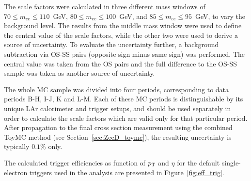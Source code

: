 The scale factors were calculated in three different mass windows of $70 \le m_{ee} \le 110$~GeV, $80 \le m_{ee} \le 100$~GeV, and $85 \le m_{ee} \le 95$~GeV, to vary the background level. The results from the middle mass window were used to define the central value of the scale factors, while the other two were used to derive a source of uncertainty. To evaluate the uncertainty further, a background subtraction via OS-SS pairs (opposite sign minus same sign) was performed. The central value was taken from the OS pairs and the full difference to the OS-SS sample was taken as another source of uncertainty.

The whole MC sample was divided into four periods, corresponding to data periods B-H, I-J, K and L-M. Each of these MC periods is distinguishable by its unique LAr calorimeter and trigger setups, and should be used separately in order to calculate the scale factors which are valid only for that particular period. After propagation to the final cross section measurement using the combined ToyMC method (see Section~\ref{sec:ZeeD_toymc}), the resulting uncertainty is typically $0.1\%$ only.

The calculated trigger efficiencies as function of $p_{\mathrm{T}}$ and $\eta$ for the default single-electron triggers used in the analysis are presented in Figure~\ref{fig:eff_trig}.

\begin{figure}
\end{figure}

